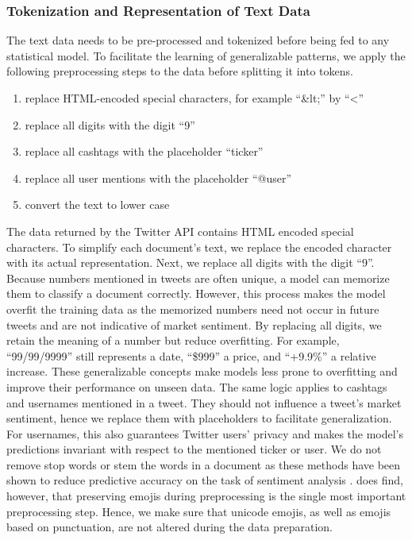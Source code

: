 \subsubsection{Tokenization and Representation of Text Data}
The text data needs to be pre-processed and tokenized before being fed to any statistical model. To facilitate the learning of generalizable patterns, we apply the following preprocessing steps to the data before splitting it into tokens.
\begin{enumerate}[noitemsep]
	\item replace HTML-encoded special characters, for example ``\&lt;'' by ``<''
	\item replace all digits with the digit ``9''
	\item replace all cashtags with the placeholder ``ticker''
	\item replace all user mentions with the placeholder ``@user''
	\item convert the text to lower case
\end{enumerate}

The data returned by the Twitter API contains HTML encoded special characters. To simplify each document's text, we replace the encoded character with its actual representation. Next, we replace all digits with the digit ``9''. Because numbers mentioned in tweets are often unique, a model can memorize them to classify a document correctly. However, this process makes the model overfit the training data as the memorized numbers need not occur in future tweets and are not indicative of market sentiment. By replacing all digits, we retain the meaning of a number but reduce overfitting. For example, ``99/99/9999'' still represents a date, ``\$999'' a price, and ``+9.9\%'' a relative increase. These generalizable concepts make models less prone to overfitting and improve their performance on unseen data. The same logic applies to cashtags and usernames mentioned in a tweet. They should not influence a tweet's market sentiment, hence we replace them with placeholders to facilitate generalization. For usernames, this also guarantees Twitter users' privacy and makes the model's predictions invariant with respect to the mentioned ticker or user. We do not remove stop words or stem the words in a document as these methods have been shown to reduce predictive accuracy on the task of sentiment analysis .  does find, however, that preserving emojis during preprocessing is the single most important preprocessing step. Hence, we make sure that unicode emojis, as well as emojis based on punctuation, are not altered during the data preparation.

